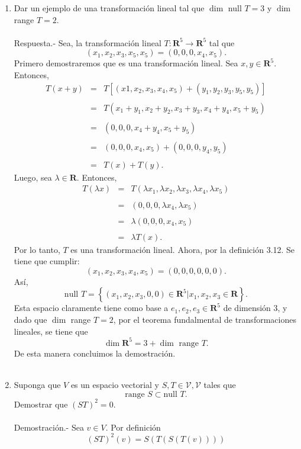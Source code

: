 \begin{enumerate}[\bfseries 1.]

    \item Dar un ejemplo de una transformación lineal tal que $\dim$ null $T=3$ y $\dim$ range $T=2$.\\\\
	Respuesta.-\; Sea, la transformación lineal $T:\textbf{R}^5 \to \textbf{R}^5$ tal que 
	$$(x_1,x_2,x_3,x_5,x_5)=(0,0,0,x_4,x_5).$$
	Primero demostraremos que es una transformación lineal. Sea $x,y\in \textbf{R}^5$. Entonces,
	$$
	\begin{array}{rcl}
	    T(x+y) &=& T\left[(x1,x_2,x_3,x_4,x_5)+(y_1,y_2,y_3,y_5,y_5)\right]\\\\
		   &=& T(x_1+y_1,x_2+y_2,x_3+y_3,x_4+y_4,x_5+y_5)\\\\
		   &=& (0,0,0,x_4+y_4,x_5+y_5)\\\\
		   &=& (0,0,0,x_4,x_5)+(0,0,0,y_4,y_5)\\\\
		   &=& T(x)+T(y).
	\end{array}
	$$
	Luego, sea $\lambda \in \textbf{R}$. Entonces,
	$$
	\begin{array}{rcl}
	    T(\lambda x) &=& T(\lambda x_1,\lambda x_2,\lambda x_3,\lambda x_4,\lambda x_5)\\\\
			 &=& (0,0,0,\lambda x_4,\lambda x_5)\\\\
			 &=& \lambda(0,0,0,x_4,x_5)\\\\
			 &=& \lambda T(x).
	\end{array}
	$$
	Por lo tanto, $T$ es una transformación lineal. Ahora, por la definición 3.12. Se tiene que cumplir:
	$$(x_1,x_2,x_3,x_4,x_5)=(0,0,0,0,0,0).$$
	Así,
	$$\mbox{null }T=\left\{(x_1,x_2,x_3,0,0)\in \textbf{R}^5 | x_1,x_2,x_3\in \textbf{R}\right\}.$$
	Esta espacio claramente tiene como base a $e_1,e_2,e_3\in \textbf{R}^5$ de dimensión $3$, y dado que $\dim$ range $T=2$, por el teorema fundalmental de transformaciones lineales, se tiene que
	$$\dim \textbf{R}^5=3+\dim \mbox{ range } T.$$
	De esta manera concluimos la demostración.\\\\

    \item Suponga que $V$ es un espacio vectorial y $S,T\in \mathcal{V,V}$ tales que
    $$\mbox{range }S\subset \mbox{null }T.$$
    Demostrar que $(ST)^2=0.$\\\\
	Demostración.-\; Sea $v\in V$. Por definición 
	$$(ST)^2(v)=S\left(T(S(T(v)))\right)$$


\end{enumerate}

